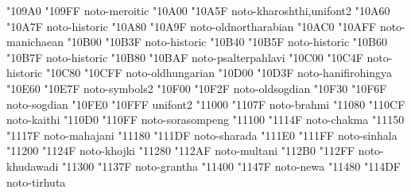 \documentclass{article}
\begin{document}
                               { "109A0} { "109FF} {noto-meroitic}
                                     { "10A00} { "10A5F} {noto-kharoshthi,unifont2}
                              { "10A60} { "10A7F} {noto-historic}
                              { "10A80} { "10A9F} {noto-oldnortharabian}
                                     { "10AC0} { "10AFF} {noto-manichaean}
                                        { "10B00} { "10B3F} {noto-historic}
                         { "10B40} { "10B5F} {noto-historic}
                          { "10B60} { "10B7F} {noto-historic}
                                { "10B80} { "10BAF} {noto-psalterpahlavi}
                                     { "10C00} { "10C4F} {noto-historic}
                                  { "10C80} { "10CFF} {noto-oldhungarian}
                                { "10D00} { "10D3F} {noto-hanifirohingya}
                           { "10E60} { "10E7F} {noto-symbols2}
                                    { "10F00} { "10F2F} {noto-oldsogdian}
                                        { "10F30} { "10F6F} {noto-sogdian}
                                        { "10FE0} { "10FFF} {unifont2}
                                         { "11000} { "1107F} {noto-brahmi}
                                         { "11080} { "110CF} {noto-kaithi}
                                   { "110D0} { "110FF} {noto-sorasompeng}
                                         { "11100} { "1114F} {noto-chakma}
                                       { "11150} { "1117F} {noto-mahajani}
                                        { "11180} { "111DF} {noto-sharada}
                        { "111E0} { "111FF} {noto-sinhala}
                                         { "11200} { "1124F} {noto-khojki}
                                        { "11280} { "112AF} {noto-multani}
                                      { "112B0} { "112FF} {noto-khudawadi}
                                        { "11300} { "1137F} {noto-grantha}
                                           { "11400} { "1147F} {noto-newa}
                                        { "11480} { "114DF} {noto-tirhuta}
\end{document}
